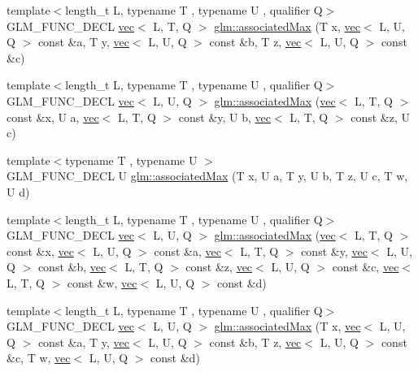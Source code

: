 \begin{DoxyCompactItemize}
\item 
{\footnotesize template$<$length\+\_\+t L, typename T , typename U , qualifier Q$>$ }\\G\+L\+M\+\_\+\+F\+U\+N\+C\+\_\+\+D\+E\+CL \hyperlink{structglm_1_1vec}{vec}$<$ L, T, Q $>$ \hyperlink{group__gtx__associated__min__max_gadd2a2002f4f2144bbc39eb2336dd2fba}{glm\+::associated\+Max} (T x, \hyperlink{structglm_1_1vec}{vec}$<$ L, U, Q $>$ const \&a, T y, \hyperlink{structglm_1_1vec}{vec}$<$ L, U, Q $>$ const \&b, T z, \hyperlink{structglm_1_1vec}{vec}$<$ L, U, Q $>$ const \&c)
\item 
{\footnotesize template$<$length\+\_\+t L, typename T , typename U , qualifier Q$>$ }\\G\+L\+M\+\_\+\+F\+U\+N\+C\+\_\+\+D\+E\+CL \hyperlink{structglm_1_1vec}{vec}$<$ L, U, Q $>$ \hyperlink{group__gtx__associated__min__max_ga19f59d1141a51a3b2108a9807af78f7f}{glm\+::associated\+Max} (\hyperlink{structglm_1_1vec}{vec}$<$ L, T, Q $>$ const \&x, U a, \hyperlink{structglm_1_1vec}{vec}$<$ L, T, Q $>$ const \&y, U b, \hyperlink{structglm_1_1vec}{vec}$<$ L, T, Q $>$ const \&z, U c)
\item 
{\footnotesize template$<$typename T , typename U $>$ }\\G\+L\+M\+\_\+\+F\+U\+N\+C\+\_\+\+D\+E\+CL U \hyperlink{group__gtx__associated__min__max_ga3038ffcb43eaa6af75897a99a5047ccc}{glm\+::associated\+Max} (T x, U a, T y, U b, T z, U c, T w, U d)
\item 
{\footnotesize template$<$length\+\_\+t L, typename T , typename U , qualifier Q$>$ }\\G\+L\+M\+\_\+\+F\+U\+N\+C\+\_\+\+D\+E\+CL \hyperlink{structglm_1_1vec}{vec}$<$ L, U, Q $>$ \hyperlink{group__gtx__associated__min__max_gaf5ab0c428f8d1cd9e3b45fcfbf6423a6}{glm\+::associated\+Max} (\hyperlink{structglm_1_1vec}{vec}$<$ L, T, Q $>$ const \&x, \hyperlink{structglm_1_1vec}{vec}$<$ L, U, Q $>$ const \&a, \hyperlink{structglm_1_1vec}{vec}$<$ L, T, Q $>$ const \&y, \hyperlink{structglm_1_1vec}{vec}$<$ L, U, Q $>$ const \&b, \hyperlink{structglm_1_1vec}{vec}$<$ L, T, Q $>$ const \&z, \hyperlink{structglm_1_1vec}{vec}$<$ L, U, Q $>$ const \&c, \hyperlink{structglm_1_1vec}{vec}$<$ L, T, Q $>$ const \&w, \hyperlink{structglm_1_1vec}{vec}$<$ L, U, Q $>$ const \&d)
\item 
{\footnotesize template$<$length\+\_\+t L, typename T , typename U , qualifier Q$>$ }\\G\+L\+M\+\_\+\+F\+U\+N\+C\+\_\+\+D\+E\+CL \hyperlink{structglm_1_1vec}{vec}$<$ L, U, Q $>$ \hyperlink{group__gtx__associated__min__max_ga11477c2c4b5b0bfd1b72b29df3725a9d}{glm\+::associated\+Max} (T x, \hyperlink{structglm_1_1vec}{vec}$<$ L, U, Q $>$ const \&a, T y, \hyperlink{structglm_1_1vec}{vec}$<$ L, U, Q $>$ const \&b, T z, \hyperlink{structglm_1_1vec}{vec}$<$ L, U, Q $>$ const \&c, T w, \hyperlink{structglm_1_1vec}{vec}$<$ L, U, Q $>$ const \&d)

\end{DoxyCompactItemize}
